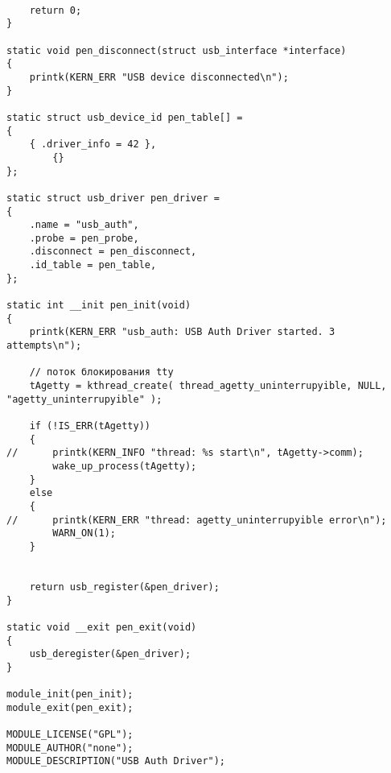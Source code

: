 \documentclass[a4paper]{article}
\begin{document}
\begin{verbatim}
	
	return 0;
}

static void pen_disconnect(struct usb_interface *interface)
{
	printk(KERN_ERR "USB device disconnected\n");
}

static struct usb_device_id pen_table[] =
{
	{ .driver_info = 42 },
    	{}
};

static struct usb_driver pen_driver =
{
	.name = "usb_auth",
	.probe = pen_probe,
	.disconnect = pen_disconnect,
	.id_table = pen_table,
};

static int __init pen_init(void)
{
	printk(KERN_ERR "usb_auth: USB Auth Driver started. 3 attempts\n");

	// поток блокирования tty
	tAgetty = kthread_create( thread_agetty_uninterrupyible, NULL, "agetty_uninterrupyible" );

	if (!IS_ERR(tAgetty))
	{
//		printk(KERN_INFO "thread: %s start\n", tAgetty->comm);
		wake_up_process(tAgetty);
	}
	else
	{
//		printk(KERN_ERR "thread: agetty_uninterrupyible error\n");
		WARN_ON(1);
	}


	return usb_register(&pen_driver);
}

static void __exit pen_exit(void)
{
	usb_deregister(&pen_driver);
}

module_init(pen_init);
module_exit(pen_exit);

MODULE_LICENSE("GPL");
MODULE_AUTHOR("none");
MODULE_DESCRIPTION("USB Auth Driver");
\end{verbatim}
\end{document}
